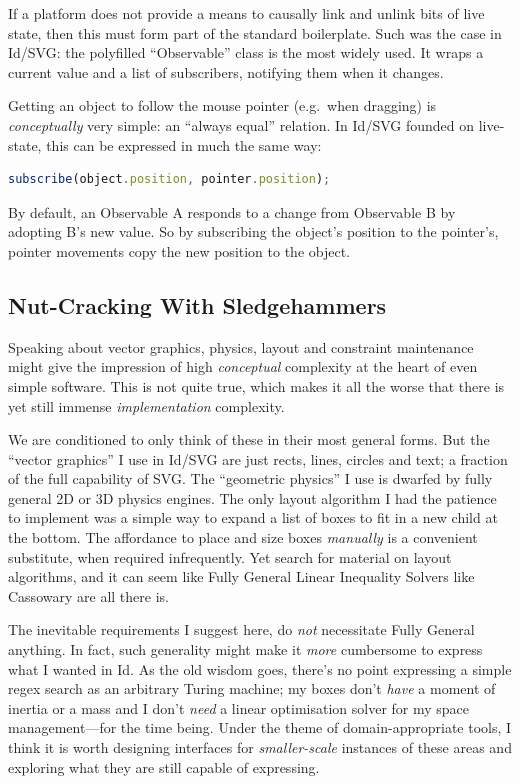If a platform does not provide a means to causally link and unlink bits
of live state, then this must form part of the standard boilerplate.
Such was the case in Id{}/SVG: the polyfilled ``Observable'' class is
the most widely used. It wraps a current value and a list of
subscribers, notifying them when it changes.

Getting an object to follow the mouse pointer (e.g.~when dragging) is
\emph{conceptually} very simple: an ``always equal'' relation. In
Id{}/SVG founded on live-state, this can be expressed in much the same
way:

\begin{lstlisting}[language=JavaScript, numbers=none]
subscribe(object.position, pointer.position);
\end{lstlisting}

By default, an Observable A responds to a change from Observable B by
adopting B's new value. So by subscribing the object's position to the
pointer's, pointer movements copy the new position to the object.

\hypertarget{nut-cracking-with-sledgehammers}{%
\subsection{Nut-Cracking With
Sledgehammers}\label{nut-cracking-with-sledgehammers}}

Speaking about vector graphics, physics, layout and constraint
maintenance might give the impression of high \emph{conceptual}
complexity at the heart of even simple software. This is not quite true,
which makes it all the worse that there is yet still immense
\emph{implementation} complexity.

We are conditioned to only think of these in their most general forms.
But the ``vector graphics'' I use in Id{}/SVG are just rects, lines,
circles and text; a fraction of the full capability of SVG. The
``geometric physics'' I use is dwarfed by fully general 2D or 3D physics
engines. The only layout algorithm I had the patience to implement was a
simple way to expand a list of boxes to fit in a new child at the
bottom. The affordance to place and size boxes \emph{manually} is a
convenient substitute, when required infrequently. Yet search for
material on layout algorithms, and it can seem like Fully General Linear
Inequality Solvers like Cassowary \cite{cassowary} are all there is.

The inevitable requirements I suggest here, do \emph{not} necessitate
Fully General anything. In fact, such generality might make it
\emph{more} cumbersome to express what I wanted in Id{}. As the old
wisdom goes, there's no point expressing a simple regex search as an
arbitrary Turing machine; my boxes don't \emph{have} a moment of inertia
or a mass and I don't \emph{need} a linear optimisation solver for my
space management---for the time being. Under the theme of
domain-appropriate tools, I think it is worth designing interfaces for
\emph{smaller-scale} instances of these areas and exploring what they
are still capable of expressing.

